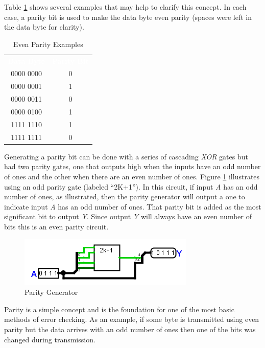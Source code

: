 Table \ref{CL:tab:even_parity_examples} shows several examples that may help to clarify this concept. In each case, a parity bit is used to make the data byte even parity (spaces were left in the data byte for clarity). 

\begin{table}[H]
  \sffamily
  \newcommand{\head}[1]{\textcolor{white}{\textbf{#1}}}    
  \begin{center}
    \begin{tabular}{cc} 
      \rowcolor{black!75}
      \head{Data Byte} & \head{Parity Bit} \\
      0000 0000 & 0 \\
      0000 0001 & 1 \\
      0000 0011 & 0 \\
      0000 0100 & 1 \\
      1111 1110 & 1 \\
      1111 1111 & 0
    \end{tabular}
  \end{center}
  \caption{Even Parity Examples}
  \label{CL:tab:even_parity_examples}
\end{table}

Generating a parity bit can be done with a series of cascading \emph{XOR} gates but \Le had two parity gates, one that outputs high when the inputs have an odd number of ones and the other when there are an even number of ones. Figure \ref{fig:08_19} illustrates using an odd parity gate (labeled ``2K+1''). In this circuit, if input \emph{A} has an odd number of ones, as illustrated, then the parity generator will output a one to indicate input \emph{A} has an odd number of ones. That parity bit is added as the most significant bit to output \emph{Y}. Since output \emph{Y} will always have an even number of bits this is an even parity circuit.

\begin{figure}[H]
	\centering
	\includegraphics[width=\maxwidth{.95\linewidth}]{gfx/08_19}
	\caption{Parity Generator}
	\label{fig:08_19}
\end{figure}

Parity is a simple concept and is the foundation for one of the most basic methods of error checking. As an example, if some byte is transmitted using even parity but the data arrives with an odd number of ones then one of the bits was changed during transmission. 

